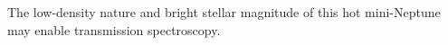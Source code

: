 \documentclass[fleqn,usenatbib]{mnras}
\newcommand{\tess}{{\it TESS}}
\newcommand{\kms}{km\,s$^{-1}$}
\newcommand{\mss}{\mbox{m\,s$^{-2}$}}
\newcommand{\masy}{mas\,yr$^{-1}$}
\newcommand{\mpl}{\mbox{$M_{p}$}}
\newcommand{\rpl}{\mbox{$R_{p}$}}
\newcommand{\mstar}{\mbox{$M_{\star}$}}
\newcommand{\rstar}{\mbox{$R_{\star}$}}
\newcommand{\mjup}{\mbox{$M_{\rm Jup}$}}
\newcommand{\rjup}{\mbox{$R_{\rm Jup}$}}
\newcommand{\msun}{\mbox{$M_{\odot}$}}
\newcommand{\rsun}{\mbox{$R_{\odot}$}}
\newcommand{\vsini}{$v\sin{i}$}
\newcommand{\teff}{$T_{\rm eff}$}
\newcommand{\feh}{\mbox{$\rm [Fe/H]$}}
\newcommand{\Tstarra}{$12^{\rm h}40^{'}08.78^{"}$}
\newcommand{\Tstardec}{$-44^{\circ}18^{'}43.48^{"}$}
\newcommand{\TGAIAGmag}{$9.9103 \pm 0.0004$}
\newcommand{\TGAIAPMRA}{$-3.72 \pm 0.097$}
\newcommand{\TGAIAPMDec}{$-13.68 \pm 0.12$}
\newcommand{\TGAIAplx}{$9.38 \pm 0.06$}
\newcommand{\TESSTmag}{$9.4628 \pm 0.006$}
\newcommand{\APASSBmag}{$10.675 \pm 0.024$}
\newcommand{\APASSVmag}{$10.09 \pm 0.03$}
\newcommand{\MASSJ}{$8.903 \pm 0.037 $ }
\newcommand{\MASSH}{$8.594 \pm 0.063$ }
\newcommand{\MASSK}{$8.502 \pm 0.024$ }
\newcommand{\Tlogg}{ $ 4.46 \pm 0.02 $ }
\newcommand{\TFeH}{ $ 0.14 \pm 0.02 $ }
\newcommand{\TMs}{ $ 0.997 \pm 0.01 $ }
\newcommand{\TRs}{ $ 1.032^{+0.025}_{-0.025} $ }
\newcommand{\Ttzerozero}{ $ 1570.101^{+0.004}_{-0.005} $ }
\newcommand{\Tb}{ $ 0.46^{+0.18}_{-0.25} $ }
\newcommand{\Tstarage}{4.0\,$\pm$\,0.2 Gyr}
\newcommand{\TGAIAid}{6133384959942131968}
\newcommand{\TICstar}{TIC-73228647}
\begin{document}
The low-density nature and bright stellar magnitude of this hot mini-Neptune may enable transmission spectroscopy.


%
\end{document}
